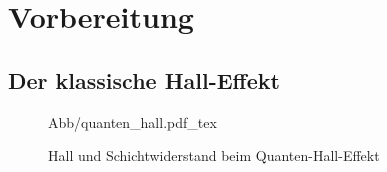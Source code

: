 \chapter{Vorbereitung}

\section{Der klassische Hall-Effekt}



\begin{figure}
    \centering
    \def\svgwidth{0.6\linewidth}
    {Abb/quanten_hall.pdf_tex}
    \caption{Hall und Schichtwiderstand beim Quanten-Hall-Effekt}
    \label{vorb:qh}
\end{figure}
